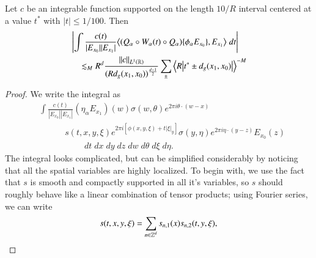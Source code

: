 \begin{lemma}
    Let $c$ be an integrable function supported on the length $10/R$ interval centered at a value $t^*$ with $|t| \leq 1/100$. Then
    \begin{align*}
        & \left| \int \frac{c(t)}{|E_{x_0}| |E_{x_1}|} \big\langle (Q_\alpha \circ W_\alpha(t) \circ Q_\alpha) \{ \phi_\alpha E_{x_0} \}, E_{x_1} \big\rangle\; dt \right|\\
        &\quad \lesssim_M R^d \frac{\| c \|_{L^1(\operatorname{\mathbb{R}})}}{( R d_g(x_1,x_0) )^{\frac{d-1}{2}}} \sum_{\pm} \Big\langle R \big| t^* \pm d_g(x_1,x_0) \big| \Big\rangle^{-M}
    \end{align*}
\end{lemma}
\begin{proof}
    We write the integral as
    \begin{align*}
        & \int \frac{c(t)}{|E_{x_0}| |E_{x_1}|} (\eta_\alpha E_{x_1})(w)  \sigma(w,\theta) e^{2 \pi i \theta \cdot (w - x)}\\
        &\quad\quad\quad s(t,x,y,\xi) e^{2 \pi i [ \phi(x,y,\xi) + t |\xi|_y ]} \sigma(y,\eta) e^{2 \pi i \eta \cdot (y - z)} E_{x_0}(z)\\
        &\quad\quad\quad\quad\quad \; dt\; dx\; dy\; dz\; dw\; d\theta\; d\xi\; d\eta.
    \end{align*}
    The integral looks complicated, but can be simplified considerably by noticing that all the spatial variables are highly localized. To begin with, we use the fact that $s$ is smooth and compactly supported in all it's variables, so $s$ should roughly behave like a linear combination of tensor products; using Fourier series, we can write
    \[ s(t,x,y,\xi) = \sum_{n \in \operatorname{\mathbb{Z}}^d} s_{n,1}(x) s_{n,2}(t,y,\xi), \]

\end{proof}
